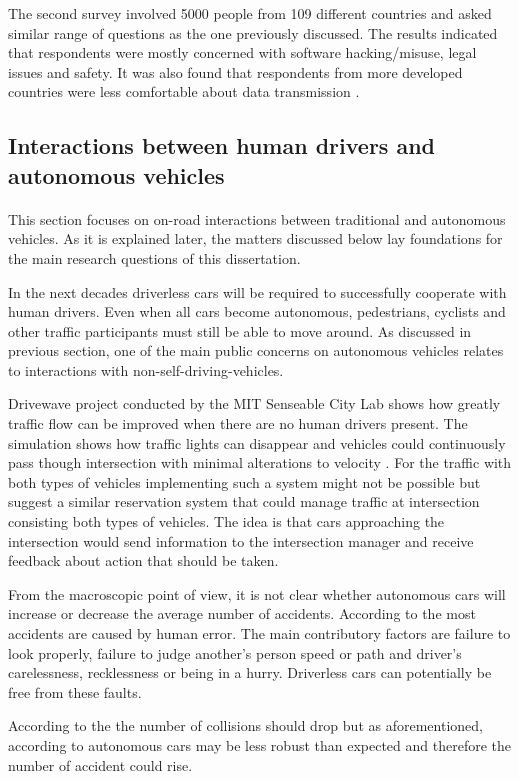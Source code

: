 \documentclass[11pt,english]{article}
\begin{document}
\par

The second survey involved 5000 people from 109 different countries and asked similar range of questions as the one previously discussed. The results indicated that respondents were mostly concerned with software hacking/misuse, legal issues and safety. It was also found that respondents from more developed countries were less comfortable about data transmission \citep{kyriakidis2015public}.



\subsection{Interactions between human drivers and autonomous vehicles}
\paragraph{}
This section focuses on on-road interactions between traditional and autonomous vehicles. As it is explained later, the matters discussed below lay foundations for the main research questions of this dissertation.

\par
In the next decades driverless cars will be required to successfully cooperate with human drivers. Even when all cars become autonomous, pedestrians, cyclists and other traffic participants must still be able to move around. As discussed in previous section, one of the main public concerns on autonomous vehicles relates to interactions with non-self-driving-vehicles.

\par
Drivewave project conducted by the MIT Senseable City Lab shows how greatly traffic flow can be  improved when there are no human drivers present. The simulation shows how traffic lights can disappear and vehicles could continuously pass though intersection with minimal alterations to velocity \citep{drivewave}. For the traffic with both types of vehicles implementing such a system might not be possible but \citet{dresner2007sharing} suggest a similar reservation system that could manage traffic at intersection consisting both types of vehicles. The idea is that cars approaching the intersection would send information to the intersection manager and receive feedback about action that should be taken.





\par
From the macroscopic point of view, it is not clear whether autonomous cars will increase or decrease the average number of accidents. According to the \citet{excel} most accidents are caused by human error. The main contributory factors are failure to look properly, failure to judge another's person speed or path and driver's carelessness, recklessness or being in a hurry. Driverless cars can potentially be free from these faults.
\par
According to the \citet{pathwaytodriverless} the number of collisions should drop but as aforementioned, according to \citet{sivak2015road}  autonomous cars may be less robust than expected and therefore the number of accident could rise. 
\end{document}
